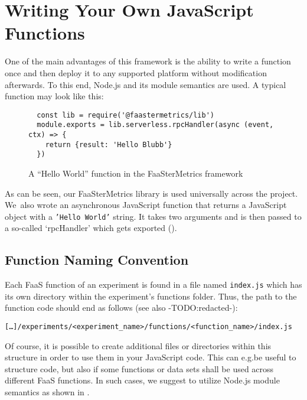 \documentclass[../main.tex]{subfiles}
\begin{document}
\section{Writing Your Own JavaScript Functions}\label{sec:jsFunctions}

One of the main advantages of this framework is the ability to write a function once 
and then deploy it to any supported platform without modification afterwards.
To this end, Node.js and its module semantics are used. A typical function may look like this:

\begin{figure}[H]
\begin{tcolorbox}
\begin{verbatim}
  const lib = require('@faastermetrics/lib')
  module.exports = lib.serverless.rpcHandler(async (event, ctx) => {
    return {result: 'Hello Blubb'}
  })
\end{verbatim}
\end{tcolorbox}
\caption{A ``Hello World'' function in the FaaSterMetrics framework}%
\label{fig:fmHelloWorld}
\end{figure}

As can be seen, our FaaSterMetrics library is used universally across the project. 
We~also wrote an asynchronous JavaScript function that returns a JavaScript object with a \texttt{'Hello World'} string. 
It takes two arguments and is then passed to a so-called `rpcHandler' which gets exported (). 

\newpage{}%
\subsection{Function Naming Convention}

Each FaaS function of an experiment is found in a file named \texttt{index.js} which has its own directory within the experiment's functions folder.
Thus, the path to the function code should end as follows (see also -TODO:\@ redacted-):%
\begin{tcolorbox}
  \texttt{[\ldots]/experiments/<experiment\_name>/functions/<function\_name>/index.js}
\end{tcolorbox}

Of course, it is possible to create additional files or directories within this structure in order to use them in your JavaScript code.
This can e.g.\@ be useful to structure code, but also if some functions or data sets shall be used across different FaaS functions.
In such cases, we suggest to utilize Node.js module semantics as shown in .
\end{document}
